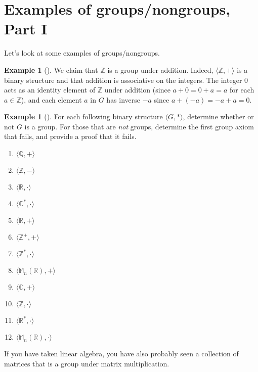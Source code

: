 \documentclass[10pt,]{book}
\theoremstyle{plain}
\theoremstyle{definition}
\theoremstyle{definition}
\theoremstyle{definition}
\newtheorem{example}[theorem]{Example}
\theoremstyle{definition}
\numberwithin{equation}{section}
\def\Z{\mathbb{Z}}
\def\R{\mathbb{R}}
\def\Q{\mathbb{Q}}
\def\C{\mathbb{C}}
\def\M{\mathbb{M}}
\begin{document}
\section[{Examples of groups/nongroups, Part I}]{Examples of groups/nongroups, Part I}\label{gpexs1}
Let's look at some examples of groups/nongroups.%
\begin{example}[]\label{example-12}
We claim that \(\Z\) is a group under addition. Indeed, \(\langle\Z,+\rangle\) is a binary structure and that addition is associative on the integers. The integer \(0\) acts as an identity element of \(\Z\) under addition (since \(a+0=0+a=a\) for each \(a\in
\Z\)), and each element \(a\) in \(G\) has inverse \(-a\) since \(a+(-a)=-a+a=0\).%
\end{example}
\begin{example}[]\label{example-13}
For each following binary structure \(\langle G,*\rangle\), determine whether or not \(G\) is a group. For those that are \emph{not} groups, determine the first group axiom  that fails, and provide a proof that it fails. \leavevmode%
\begin{multicols}{4}
\begin{enumerate}
\item\hypertarget{li-79}{}\(\langle \Q,+\rangle\)%
\item\hypertarget{li-80}{}\(\langle \Z,-\rangle\)%
\item\hypertarget{li-81}{}\(\langle \R,\cdot\rangle\)%
\item\hypertarget{li-82}{}\(\langle \C^*,\cdot\rangle\)%
\item\hypertarget{li-83}{}\(\langle \R,+\rangle\)%
\item\hypertarget{li-84}{}\(\langle \Z^+,+\rangle\)%
\item\hypertarget{li-85}{}\(\langle \Z^*,\cdot\rangle\)%
\item\hypertarget{li-86}{}\(\langle \M_n(\R),+\rangle\)%
\item\hypertarget{li-87}{}\(\langle \C,+\rangle\)%
\item\hypertarget{li-88}{}\(\langle \Z,\cdot\rangle\)%
\item\hypertarget{li-89}{}\(\langle \R^*,\cdot\rangle\)%
\item\hypertarget{li-90}{}\(\langle \M_n(\R),\cdot\rangle\)%
\end{enumerate}
\end{multicols}
%
\end{example}
If you have taken linear algebra, you have also probably seen a collection of matrices that is a group under matrix multiplication.%
\end{document}
